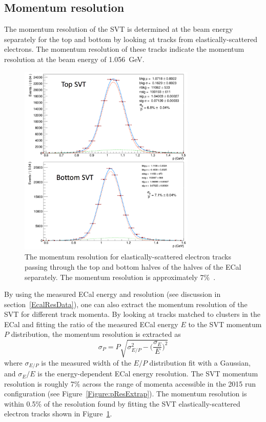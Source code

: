 \subsection{Momentum resolution}
The momentum resolution of the SVT is determined at the beam energy separately for the top and bottom by looking at tracks from elastically-scattered electrons. The momentum resolution of these tracks indicate the momentum resolution at the beam energy of 1.056~GeV. 

\begin{figure}[thb]
  \centering
      \includegraphics[width=0.75\textwidth]{pics/performance/SVTMom.png}
  \caption[Momentum resolution of the SVT]{The momentum resolution for elastically-scattered electron tracks passing through the top and bottom halves of the halves of the ECal separately. The momentum resolution is approximately 7$\%$~\cite{moreno_search_2016}.}
  \label{Figure:pRes}
\end{figure}

By using the measured ECal energy and resolution (see discussion in section~\ref{EcalResData}), one can also extract the momentum resolution of the SVT for different track momenta. By looking at tracks matched to clusters in the ECal and fitting the ratio of the measured ECal energy $E$ to the SVT momentum $P$ distribution, the momentum resolution is extracted as
\begin{equation}
	\label{eq:pres}
	\sigma_P = P\sqrt{\sigma_{E/P}^2-\Big(\dfrac{\sigma_E}{E}\Big)^2} 
\end{equation}
where $\sigma_{E/P}$ is the measured width of the $E/P$ distribution fit with a Gaussian, and $\sigma_E/E$ is the energy-dependent ECal energy resolution. The SVT momentum resolution is roughly 7$\%$ across the range of momenta accessible in the 2015 run configuration (see Figure~\ref{Figure:pResExtrap}). The momentum resolution is within 0.5$\%$ of the resolution found by fitting the SVT elastically-scattered electron tracks shown in Figure~\ref{Figure:pRes}.

